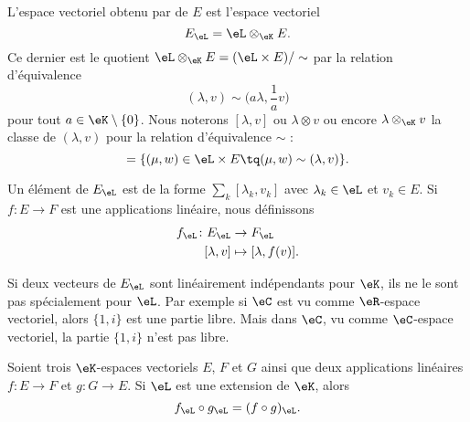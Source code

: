 \begin{definition}
	L'espace vectoriel obtenu par  de \( E\) est l'espace vectoriel
	\begin{equation}
		E_{\eL}=\eL\otimes_{\eK}E.
	\end{equation}
	Ce dernier est le quotient \( \eL\otimes_{\eK}E=(\eL\times E)/\sim\) par la relation d'équivalence
	\begin{equation}
		(\lambda,v)\sim\big( a\lambda,\frac{1}{ a }v \big)
	\end{equation}
	pour tout \( a\in \eK\setminus\{ 0 \}\). Nous noterons \( [\lambda,v]\) ou \( \lambda\otimes v\) ou encore \( \lambda\otimes_{\eK}v\) la classe de \( (\lambda,v)\) pour la relation d'équivalence \( \sim\) :
	\begin{equation}
		[\lambda, v]=\{ (\mu, w)\in \eL\times E\tq (\mu,w)\sim(\lambda,v) \}.
	\end{equation}
\end{definition}
Un élément de \( E_{\eL}\) est de la forme \( \sum_k[\lambda_k,v_k]\) avec \( \lambda_k\in \eL\) et \( v_k\in E\). Si \( f\colon E\to F\) est une applications linéaire, nous définissons
\begin{equation}        \label{EQooYGVHooHYbMHX}
	\begin{aligned}
		f_{\eL}\colon E_{\eL} & \to F_{\eL}             \\
		[\lambda,v]           & \mapsto [\lambda,f(v)].
	\end{aligned}
\end{equation}

\begin{remark}
	Si deux vecteurs de \( E_{\eL}\) sont linéairement indépendants pour \( \eK\), ils ne le sont pas spécialement pour \( \eL\). Par exemple si \( \eC\) est vu comme \( \eR\)-espace vectoriel, alors \( \{ 1,i \}\) est une partie libre. Mais dans \( \eC\), vu comme \( \eC\)-espace vectoriel, la partie \( \{ 1,i \}\) n'est pas libre.
\end{remark}

\begin{lemma}       \label{LEMooJIGTooMqiJSN}
	Soient trois \( \eK\)-espaces vectoriels \( E\), \( F\) et \( G\) ainsi que deux applications linéaires \( f\colon E\to F\) et \( g\colon G\to E\). Si \( \eL\) est une extension de \( \eK\), alors
	\begin{equation}
		f_{\eL}\circ g_{\eL}=(f\circ g)_{\eL}.
	\end{equation}
\end{lemma}

